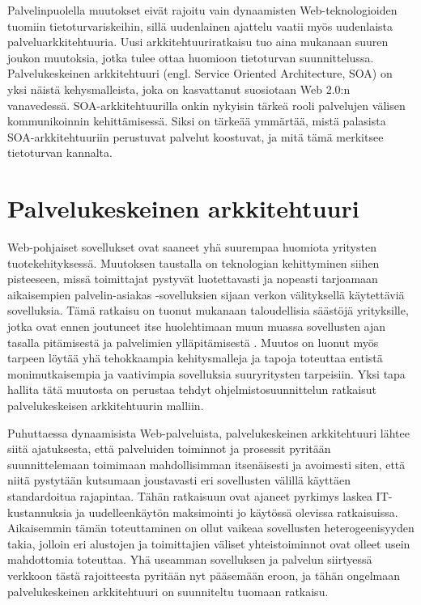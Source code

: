 Palvelinpuolella muutokset eivät rajoitu vain dynaamisten Web-\-teknologioiden tuomiin
tietoturvariskeihin, sillä uudenlainen ajattelu vaatii myös uudenlaista
palveluarkkitehtuuria. Uusi arkkitehtuuriratkaisu tuo aina mukanaan suuren
joukon muutoksia, jotka tulee ottaa huomioon tietoturvan suunnittelussa.
Palvelukeskeinen arkkitehtuuri (engl. Service Ori\-ent\-ed Architecture, SOA) on
yksi näistä kehysmalleista, joka on kasvattanut suosiotaan Web 2.0:n
vanavedessä. SOA-ark\-ki\-teh\-tuu\-ril\-la onkin nykyisin tärkeä rooli palvelujen
välisen kommunikoinnin kehittämisessä. Siksi on tärkeää ymmärtää, mistä
palasista SOA-arkkitehtuuriin perustuvat palvelut koostuvat, ja mitä tämä
merkitsee tietoturvan kannalta.

\section{Palvelukeskeinen arkkitehtuuri}

Web-pohjaiset sovellukset ovat saaneet yhä suurempaa huomiota yritysten
tuotekehityksessä. Muutoksen taustalla on teknologian
kehittyminen siihen pisteeseen, missä toimittajat pystyvät
luotettavasti ja nopeasti tarjoamaan aikaisempien
palvelin-asiakas -sovelluksien sijaan verkon välityksellä käytettäviä sovelluksia. Tämä
ratkaisu on tuonut mukanaan taloudellisia säästöjä yrityksille, jotka ovat ennen
joutuneet itse huolehtimaan muun muassa sovellusten ajan tasalla pitämisestä ja
palvelimien ylläpitämisestä \cite{WEB2}. Muutos on luonut myös tarpeen löytää yhä
tehokkaampia kehitysmalleja ja tapoja toteuttaa entistä monimutkaisempia ja
vaativimpia sovelluksia suuryritysten tarpeisiin. Yksi tapa hallita tätä
muutosta on perustaa tehdyt ohjelmistosuunnittelun ratkaisut palvelukeskeisen
arkkitehtuurin malliin.

Puhuttaessa dynaamisista Web-palveluista, palvelukeskeinen arkkitehtuuri lähtee siitä
ajatuksesta, että palveluiden toiminnot ja prosessit pyritään suunnittelemaan
toimimaan mahdollisimman itsenäisesti ja avoimesti siten, että niitä pystytään
kutsumaan joustavasti eri sovellusten välillä käyttäen standardoitua rajapintaa.
Tähän ratkaisuun ovat ajaneet pyrkimys laskea IT-kustannuksia ja
uudelleenkäytön maksimointi jo käytössä olevissa 
ratkaisuissa. Aikaisemmin tämän toteuttaminen
on ollut vaikeaa sovellusten heterogeenisyyden takia, jolloin eri
alustojen ja toimittajien väliset yhteistoiminnot ovat olleet usein mahdottomia
toteuttaa. Yhä useamman sovelluksen ja palvelun siirtyessä verkkoon tästä
rajoitteesta pyritään nyt pääsemään eroon, ja tähän ongelmaan palvelukeskeinen arkkitehtuuri
on suunniteltu tuomaan ratkaisu.


